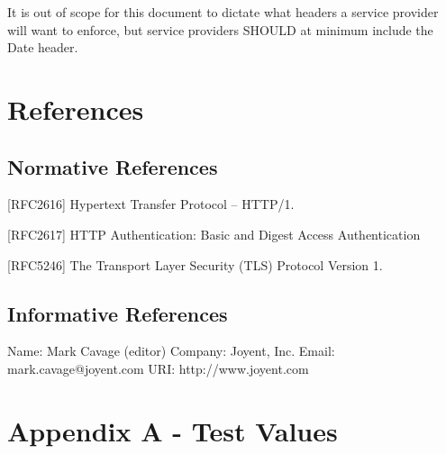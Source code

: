 It is out of scope for this document to dictate what headers a service provider will want to enforce, but service providers S\+H\+O\+U\+LD at minimum include the {\ttfamily Date} header.

\section*{References}

\subsection*{Normative References}


\begin{DoxyItemize}
\item \mbox{[}R\+F\+C2616\mbox{]} Hypertext Transfer Protocol -- H\+T\+T\+P/1.
\item \mbox{[}R\+F\+C2617\mbox{]} H\+T\+TP Authentication\+: Basic and Digest Access Authentication
\item \mbox{[}R\+F\+C5246\mbox{]} The Transport Layer Security (T\+LS) Protocol Version 1.
\end{DoxyItemize}

\subsection*{Informative References}

\begin{DoxyVerb}Name: Mark Cavage (editor)
Company: Joyent, Inc.
Email: mark.cavage@joyent.com
URI: http://www.joyent.com
\end{DoxyVerb}


\section*{Appendix A -\/ Test Values}

